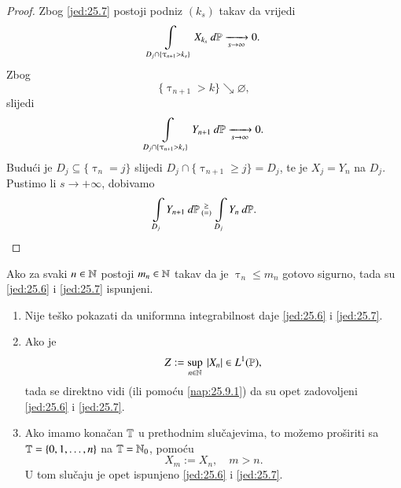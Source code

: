 \begin{proof}
    Zbog \eqref{jed:25.7} postoji podniz $(k_s)$ takav da vrijedi
    \begin{equation*}
        \int\limits_{D_j \cap \{ \uptau_{n + 1} > k_s \}} X_{k_s} \: d \mathbb{P} \xrightarrow[s \to \infty]{} 0.
    \end{equation*}
    Zbog
    \begin{equation*}
        \{ \uptau_{n + 1} > k \} \searrow \varnothing,
    \end{equation*}
    slijedi
    \begin{equation*}
        \int\limits_{D_j \cap \{ \uptau_{n + 1} > k_s \}} Y_{n + 1} \: d \mathbb{P} \xrightarrow[s \to \infty]{} 0.
    \end{equation*}
    Budu\' ci je $D_j \subseteq \{ \uptau_n = j \}$ slijedi $D_j \cap \{ \uptau_{n + 1} \geq j \} = D_j$, te je $X_j = Y_n$ na $D_j$.
    Pustimo li $s \to +\infty$, dobivamo
    \begin{equation*}
        \int\limits_{D_j} Y_{n + 1} \: d \mathbb{P}
        \begin{smallmatrix}
            \geq\\
            (=)
        \end{smallmatrix}
        \int\limits_{D_j} Y_n \: d \mathbb{P}.
    \end{equation*}
\end{proof}

\begin{zad} \label{zad:25.8}
    Ako za svaki $n \in \mathbb{N}$ postoji $m_n \in \mathbb{N}$ takav da je $\uptau_n \leq m_n$ gotovo sigurno, tada su \eqref{jed:25.6} i \eqref{jed:25.7} ispunjeni.
\end{zad}

\begin{nap} \label{nap:25.9}
    \begin{enumerate}[label=(\alph*)]
        \item \label{nap:25.9.1}
        Nije te\v sko pokazati da uniformna integrabilnost daje \eqref{jed:25.6} i \eqref{jed:25.7}.
        \item \label{nap:25.9.2}
        Ako je
        \begin{equation*}
            Z := \sup\limits_{n \in \mathbb{N}} \: |X_n| \in L^1 (\mathbb{P}),
        \end{equation*}
        tada se direktno vidi (ili pomo\' cu \ref{nap:25.9.1}) da su opet zadovoljeni \eqref{jed:25.6} i \eqref{jed:25.7}.
        \item \label{25.9.3}
        Ako imamo kona\v can $\mathbb{T}$ u prethodnim slu\v cajevima, to mo\v zemo pro\v siriti sa $\mathbb{T} = \{0, 1, \ldots, n\}$ na $\mathbb{T} = \mathbb{N}_0$, pomo\' cu
        \begin{equation*}
            X_m := X_n, \quad m > n.
        \end{equation*}
        U tom slu\v caju je opet ispunjeno \eqref{jed:25.6} i \eqref{jed:25.7}.
    \end{enumerate}
\end{nap}

